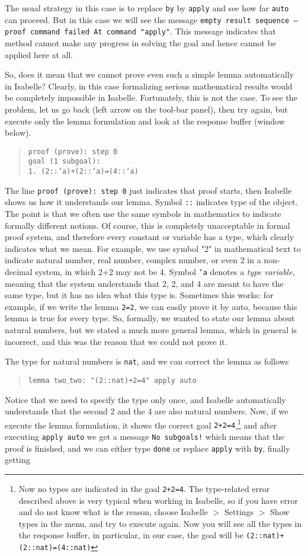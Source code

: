 \documentclass[11pt]{article}
\newcommand{\prog}[1]{\par\noindent\begin{quote}#1\end{quote}\par\noindent}
\begin{document}
The usual strategy in this case is to replace {\tt by} by {\tt apply} and see how far {\tt auto} can proceed. But in this case we will see the message {\tt empty result sequence -- proof command failed At command "apply"}. This message indicates that method cannot make any progress in solving the goal and hence cannot be applied here at all.

So, does it mean that we cannot prove even such a simple lemma automatically in Isabelle? Clearly, in this case formalizing serious mathematical results would be completely impossible in Isabelle. Fortunately, this is not the case. To see the problem, let us go back (left arrow on the tool-bar panel), then try again, but execute only the lemma formulation and look at the response buffer (window below).

\prog{\tt proof (prove): step 0\\
    goal (1 subgoal):\\
    1. (2::'a)+(2::'a)=(4::'a)}%

The line {\tt proof (prove):~step 0} just indicates that proof starts, then Isabelle shows us how it understands our lemma. Symbol {\tt ::} indicates type of the object. The point is that we often use the same symbols in mathematics to indicate formally different notions. Of course, this is completely unacceptable in formal proof system, and therefore every constant or variable has a type, which clearly indicates what we mean. For example, we use symbol "2" in mathematical text to indicate natural number, real number, complex number, or even 2 in a non-decimal system, in which 2+2 may not be 4. Symbol {\tt 'a} denotes a \emph{type variable}, meaning that the system understands that 2, 2, and 4 are meant to have the same type, but it has no idea what this type is. Sometimes this works: for example, if we write the lemma {\tt 2=2}, we can easily prove it by auto, because this lemma is true for every type. So, formally, we wanted to state our lemma about natural numbers, but we stated a much more general lemma, which in general is incorrect, and this was the reason that we could not prove it.

The type for natural numbers is {\tt nat}, and we can correct the lemma as follows

\prog{\tt lemma two$\_$two: "(2::nat)+2=4" apply auto}%

Notice that we need to specify the type only once, and Isabelle automatically understands that the second 2 and the 4 are also natural numbers. Now, if we execute the lemma formulation, it shows the correct goal {\tt 2+2=4},\footnote{Now no types are indicated in the goal {\tt 2+2=4}. The type-related error described above is very typical when working in Isabelle, so if you have error and do not know what is the reason, choose Isabelle $>$ Settings $>$ Show types in the menu, and try to execute again. Now you will see all the types in the response buffer, in particular, in our case, the goal will be {\tt (2::nat)+(2::nat)=(4::nat)}} and after executing {\tt apply auto} we get a message {\tt No subgoals!} which means that the proof is finished, and we can either type {\tt done} or replace {\tt apply} with {\tt by}, finally getting
\end{document}
